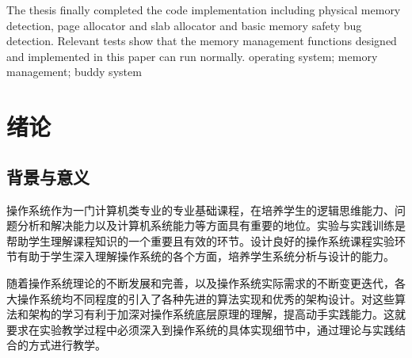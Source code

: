 \documentclass[AutoFakeBold]{LZUThesis}
\begin{document}
\begin{sloppypar}
{The thesis finally completed the code implementation including physical memory detection, page allocator and slab allocator and basic memory safety bug detection. Relevant tests show that the memory management functions designed and implemented in this paper can run normally.
}
{
operating system; memory management; buddy system
}



\customcontent




\mainmatter

\chapter{绪论}


\section{背景与意义}

操作系统作为一门计算机类专业的专业基础课程，在培养学生的逻辑思维能力、问题分析和解决能力以及计算机系统能力等方面具有重要的地位。实验与实践训练是帮助学生理解课程知识的一个重要且有效的环节。设计良好的操作系统课程实验环节有助于学生深入理解操作系统的各个方面，培养学生系统分析与设计的能力。

随着操作系统理论的不断发展和完善，以及操作系统实际需求的不断变更迭代，各大操作系统均不同程度的引入了各种先进的算法实现和优秀的架构设计。对这些算法和架构的学习有利于加深对操作系统底层原理的理解，提高动手实践能力。这就要求在实验教学过程中必须深入到操作系统的具体实现细节中，通过理论与实践结合的方式进行教学。


\end{sloppypar}
\end{document}
